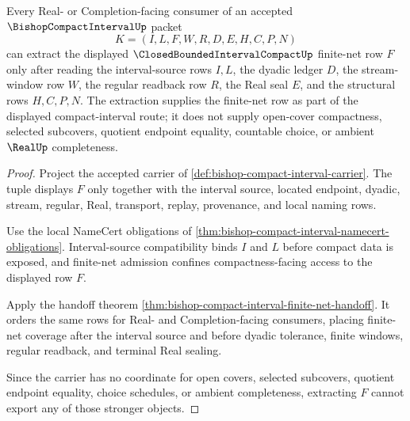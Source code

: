 \begin{theorem}
\label{thm:bishop-compact-interval-finite-net-extraction}
Every Real- or Completion-facing consumer of an accepted $\BishopCompactIntervalUp$ packet
$$
K=(I,L,F,W,R,D,E,H,C,P,N)
$$
can extract the displayed $\ClosedBoundedIntervalCompactUp$ finite-net row $F$ only after reading the interval-source rows $I,L$, the dyadic ledger $D$, the stream-window row $W$, the regular readback row $R$, the Real seal $E$, and the structural rows $H,C,P,N$. The extraction supplies the finite-net row as part of the displayed compact-interval route; it does not supply open-cover compactness, selected subcovers, quotient endpoint equality, countable choice, or ambient $\RealUp$ completeness.
\end{theorem}
\begin{proof}
Project the accepted carrier of \autoref{def:bishop-compact-interval-carrier}. The tuple displays $F$ only together with the interval source, located endpoint, dyadic, stream, regular, Real, transport, replay, provenance, and local naming rows.

Use the local NameCert obligations of \autoref{thm:bishop-compact-interval-namecert-obligations}. Interval-source compatibility binds $I$ and $L$ before compact data is exposed, and finite-net admission confines compactness-facing access to the displayed row $F$.

Apply the handoff theorem \autoref{thm:bishop-compact-interval-finite-net-handoff}. It orders the same rows for Real- and Completion-facing consumers, placing finite-net coverage after the interval source and before dyadic tolerance, finite windows, regular readback, and terminal Real sealing.

Since the carrier has no coordinate for open covers, selected subcovers, quotient endpoint equality, choice schedules, or ambient completeness, extracting $F$ cannot export any of those stronger objects.
\end{proof}

